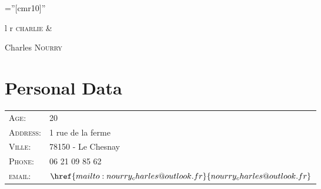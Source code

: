 \documentclass[a4paper,10pt]{article}
\begin{document}

\pagestyle{empty} %

\font\fb=''[cmr10]'' %


\Large{
  \begin{tabu}{ l r }
   \scshape{charlie} &  \\
    
  \end{tabu}
}

\par{%
	\Large
	Charles \textsc{Nourry}
	\bigskip\par}

\section{Personal Data}

\begin{tabular}{ll}
    \textsc{Age:} & 20 \\
    \textsc{Address:}   & 1 rue de la ferme \\
    \textsc{Ville:} 	& 78150 - Le Chesnay\\
    \textsc{Phone:}     & 06 21 09 85 62\\
    \textsc{email:}     & $\href{mailto:nourry_charles@outlook.fr}{nourry_charles@outlook.fr}$
\end{tabular}

\end{document}
